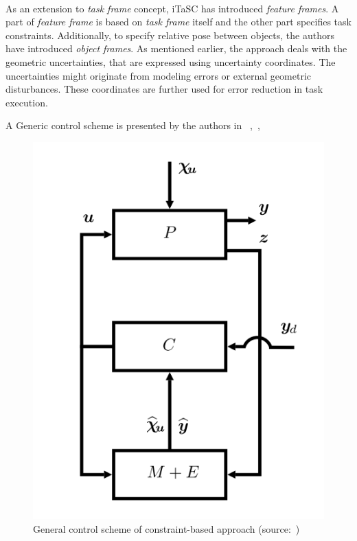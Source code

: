 \paragraph{}As an extension to \textit{task frame} concept, iTaSC has introduced \textit{feature frames}. A part of \textit{feature frame} is based on \textit{task frame} itself and the other part specifies task constraints. Additionally, to specify relative pose between objects, the authors have introduced \textit{object frames}. As mentioned earlier, the approach deals with the geometric uncertainties, that are expressed using uncertainty coordinates. The uncertainties might originate from modeling errors or external geometric disturbances. These coordinates are further used for error reduction in task execution. 

A Generic control scheme is presented by the authors in ~\cite{de2007constraint},~\cite{smits2009itasc},


\begin{figure}[h!]
	\centering
	\includegraphics[scale=0.4]{images/General-control-scheme.png}
	\caption{General control scheme of constraint-based approach (source:~\cite{de2007constraint})}
	\label{fig:control}
\end{figure}

